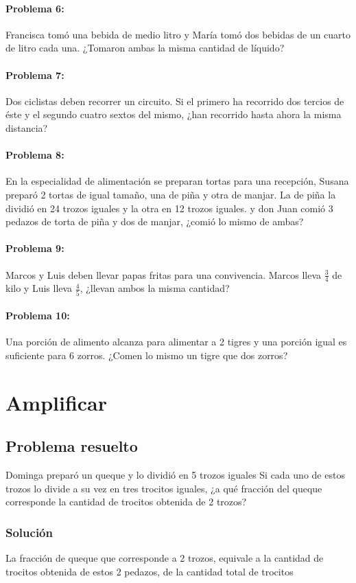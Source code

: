 \documentclass[10pt,twoside]{article}
\begin{document}
\paragraph*{Problema 6:}
Francisca tomó una bebida de medio litro y María tomó dos bebidas de un cuarto de litro cada una. ¿Tomaron ambas la misma cantidad de líquido?
\paragraph*{Problema 7:}
Dos ciclistas deben recorrer un circuito. Si el primero ha recorrido dos tercios de éste y el segundo cuatro sextos del mismo, ¿han recorrido hasta ahora la misma distancia?
\paragraph*{Problema 8:} 
En la especialidad de alimentación se preparan tortas para una recepción, Susana preparó 2 tortas de igual tamaño, una de piña y otra de manjar. La de piña la dividió en 24 trozos
iguales y la otra en 12 trozos iguales. y don Juan comió 3 pedazos de torta de piña y dos de manjar, ¿comió lo mismo de ambas?
\paragraph*{Problema 9:}
Marcos y Luis deben llevar papas fritas para una convivencia. Marcos lleva $\frac{3}{4}$ de kilo y Luis lleva $\frac{4}{5}$, ¿llevan ambos la misma cantidad?
\paragraph*{Problema 10:}
Una porción de alimento alcanza para alimentar a 2 tigres y una porción igual es suficiente para 6 zorros. ¿Comen lo mismo un tigre que dos zorros?
\section*{Amplificar}
\subsection*{Problema resuelto}
Dominga preparó un queque y lo dividió en 5 trozos iguales Si cada uno de estos trozos lo divide a su vez en tres trocitos iguales, ¿a qué fracción del queque corresponde la cantidad de trocitos obtenida de 2 trozos?
\subsubsection*{Soluci\'{o}n}
La fracción de queque que corresponde a 2 trozos, equivale a la cantidad de trocitos obtenida de estos 2 pedazos, de la cantidad total de trocitos
\end{document}
